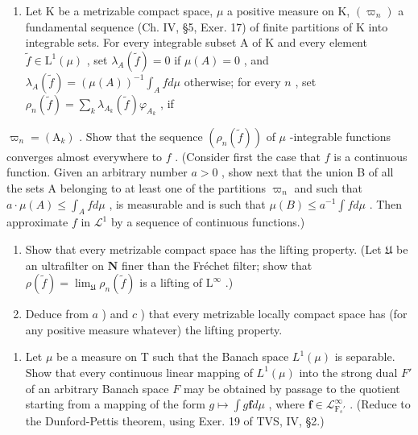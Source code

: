 \begin{enumerate}
\def\labelenumi{\alph{enumi})}
\setcounter{enumi}{1}
\tightlist
\item
  Let K be a metrizable compact space, \(\mu\) a positive measure on K, \((\varpi_n)\) a fundamental sequence (Ch. IV, §5, Exer. 17) of finite partitions of K into integrable sets. For every integrable subset A of K and every element \(\widetilde{f} \in \mathrm{L}^1(\mu)\) , set \(\lambda_A(\widetilde{f}) = 0\) if \(\mu(A) = 0\) , and \(\lambda_A(\widetilde{f}) = (\mu(A))^{-1} \int_{A} f d\mu\) otherwise; for every \(n\) , set \(\rho_n(\widetilde{f}) = \sum_k \lambda_{A_k}(\widetilde{f}) \varphi_{A_k}\) , if
\end{enumerate}

\(\varpi_{n} = (\mathrm{A}_{k})\) . Show that the sequence \((\rho_{n}(\tilde{f}))\) of \(\mu\) -integrable functions converges almost everywhere to \(f\) . (Consider first the case that \(f\) is a continuous function. Given an arbitrary number \(a > 0\) , show next that the union B of all the sets A belonging to at least one of the partitions \(\varpi_{n}\) and such that \(a \cdot \mu(A) \leqslant \int_{A} f d\mu\) , is measurable and is such that \(\mu(B) \leqslant a^{-1} \int f d\mu\) . Then approximate \(f\) in \(\mathcal{L}^{1}\) by a sequence of continuous functions.)

\begin{enumerate}
\def\labelenumi{\alph{enumi})}
\setcounter{enumi}{2}
\item
  Show that every metrizable compact space has the lifting property. (Let \(\mathfrak{U}\) be an ultrafilter on \(\mathbf{N}\) finer than the Fréchet filter; show that \(\rho(\widetilde{f}) = \lim_{\mathfrak{U}} \rho_n(\widetilde{f})\) is a lifting of \(\mathrm{L}^{\infty}\) .)
\item
  Deduce from \(a\) ) and \(c\) ) that every metrizable locally compact space has (for any positive measure whatever) the lifting property.
\end{enumerate}

\begin{enumerate}
\def\labelenumi{\arabic{enumi})}
\setcounter{enumi}{18}
\tightlist
\item
  Let \(\mu\) be a measure on T such that the Banach space \(L^1 (\mu)\) is separable. Show that every continuous linear mapping of \(L^1 (\mu)\) into the strong dual \(F'\) of an arbitrary Banach space \(F\) may be obtained by passage to the quotient starting from a mapping of the form \(g\mapsto \int g\mathbf{f}d\mu\) , where \(\mathbf{f}\in \mathcal{L}_{\mathrm{F}_s'}^\infty\) . (Reduce to the Dunford-Pettis theorem, using Exer. 19 of TVS, IV, §2.)
\end{enumerate}

